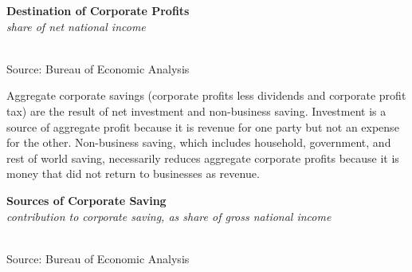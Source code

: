 \documentclass{report}
\makeatletter
\newcommand{\tbllink}[1]{\href{https://raw.githubusercontent.com/bdecon/US-chartbook/master/chartbook/data/#1}{\faTable}}
\newcommand*\short[1]{\expandafter\@gobbletwo\number\numexpr#1\relax}
\newcommand{\sbar}[4]{
		\addplot[ybar stacked, bar width=2.7pt, draw opacity=0, fill=#1] 
			table [x=#2, y=#3, col sep=comma]{#4};}
\newcommand{\dateaxisticks}{
		date coordinates in=x, axis line style={draw=none},
		xmax={2020-02-01},
		max space between ticks=40,	    
		xtick={{1990-01-01}, {1992-01-01}, {1994-01-01}, 
			{1996-01-01}, {1998-01-01}, {2000-01-01}, 
			{2002-01-01}, {2004-01-01}, {2006-01-01},
			{2008-01-01}, {2010-01-01}, {2012-01-01}, {2014-01-01},
		    {2016-01-01}, {2018-01-01}, {2020-01-01}},
		minor xtick={{1989-01-01}, {1991-01-01}, {1993-01-01},
			{1995-01-01}, {1997-01-01}, {1999-01-01}, 
			{2001-01-01}, {2003-01-01}, {2005-01-01}, {2007-01-01},
		    {2009-01-01}, {2011-01-01}, {2013-01-01}, {2015-01-01},
		    {2017-01-01}, {2019-01-01}},
		enlarge y limits={0.06}, enlarge x limits={0.01},
		}
\newcommand{\bbar}[2]{extra #1 ticks = {{#2}}, extra #1 tick labels = ,
		extra #1 tick style = {grid=major, grid style={thick, black!25}},}
\newcommand{\rbars}{
		\fill[color=black!10] (axis cs:{1990-07-01},\pgfkeysvalueof{/pgfplots/ymin}) rectangle 
			(axis cs:{1991-03-01}, \pgfkeysvalueof{/pgfplots/ymax});
		\fill[color=black!10] (axis cs:{2007-12-01},\pgfkeysvalueof{/pgfplots/ymin}) rectangle 
			(axis cs:{2009-07-01}, \pgfkeysvalueof{/pgfplots/ymax});
		\fill[color=black!10] (axis cs:{2001-03-01},\pgfkeysvalueof{/pgfplots/ymin}) rectangle 
			(axis cs:{2001-11-01}, \pgfkeysvalueof{/pgfplots/ymax});}
\makeatother
\begin{document}
{{{{\begin{minipage}{0.76\textwidth}
\vspace{2mm}

\noindent \normalsize \textbf{Destination of Corporate Profits}\\
\footnotesize{\textit{share of net national income}}\\
\noindent \hspace*{-2mm} \\
\footnotesize{Source: Bureau of Economic Analysis} \hfill \tbllink{cprof.csv}\\

\vspace{4mm}

\small Aggregate corporate savings (corporate profits less dividends and corporate profit tax) are the result of net investment and non-business saving. Investment is a source of aggregate profit because it is revenue for one party but not an expense for the other. Non-business saving, which includes household, government, and rest of world saving, necessarily reduces aggregate corporate profits because it is money that did not return to businesses as revenue. \\

\vspace{2mm}

\noindent \normalsize \textbf{Sources of Corporate Saving}\\
\footnotesize{\textit{contribution to corporate saving, as share of gross national income}}\\
\noindent \hspace*{-2mm} \\
\footnotesize{Source: Bureau of Economic Analysis} \hfill \tbllink{cprof2.csv}


\end{minipage}}}}}
\end{document}
